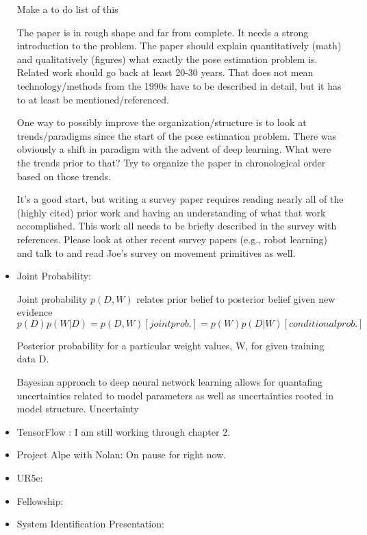 \documentclass[11pt]{article}
\begin{document}
\begin{itemize}
        Make a to do list of this 
	
	The paper is in rough shape and far from complete.  It needs a strong introduction to the problem.  The paper should explain quantitatively (math) and qualitatively (figures) what exactly the pose estimation problem is.  Related work should go back at least 20-30 years.  That does not mean technology/methods from the 1990s have to be described in detail, but it has to at least be mentioned/referenced.

One way to possibly improve the organization/structure is to look at trends/paradigms since the start of the pose estimation problem.  There was obviously a shift in paradigm with the advent of deep learning.  What were the trends prior to that?  Try to organize the paper in chronological order based on those trends.


It's a good start, but writing a survey paper requires reading nearly all of the (highly cited) prior work and having an understanding of what that work accomplished.  This work all needs to be briefly described in the survey with references.  Please look at other recent survey papers (e.g., robot learning) and talk to and read Joe's survey on movement primitives as well.


\item Joint Probability: 

Joint probability \( p(D,W)\) relates prior belief to posterior belief given new evidence 
\( p(D)p(W|D) = p(D,W) [joint prob.] = p(W)p(D|W) [conditional prob.] \)

Posterior probability for a particular weight values, W, for given training data D. 

Bayesian approach to deep neural network learning allows for quantafing uncertainties related to model parameters as well as uncertainties rooted in model structure. Uncertainty 


	\item TensorFlow \cite{CVTF2}: I am still working through chapter 2. 


	\item Project Alpe with Nolan: On pause for right now. 
	\item UR5e: 
	\item Fellowship:
	\item System Identification Presentation:



\end{itemize}

\end{document}
